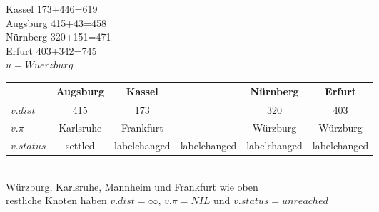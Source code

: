 \documentclass{article}
\begin{document}
\begin{enumerate}
Kassel 173+446=619\\
Augsburg 415+43=458\\
Nürnberg 320+151=471 \\
Erfurt 403+342=745 \\
$u=Wuerzburg$ \\
  \begin{tabular}{| l | c | c | c | c | c |}
    \hline
      & Augsburg & Kassel &  & Nürnberg & Erfurt \\ \hline
    $v.dist$ & 415 & 173 &  & 320 & 403  \\ \hline
    $v.\pi$ & Karlsruhe & Frankfurt &  & Würzburg & Würzburg \\ \hline 
    $v.status$ & settled & labelchanged & labelchanged & labelchanged & labelchanged \\
    \hline
  \end{tabular}\\
  Würzburg, Karlsruhe, Mannheim und Frankfurt wie oben \\
  restliche Knoten haben $v.dist=\infty$, $v.\pi=NIL$ und $v.status=unreached$
\end{enumerate}
\end{document}
